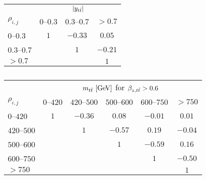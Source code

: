 \begin{table}[!htp]\centering
\begin{tabular}{l c c c }
  \toprule
  &\multicolumn{3}{c}{$|y_{t\bar{t}}{}|$}    \\
  $\rho_{i,j}$      &  $0$--$0.3$   &  $0.3$--$0.7$  &  $>0.7$  \\
  \midrule
  $0$--$0.3$    &   $1$   &   $-0.33$  &   $0.05$   \\
  $0.3$--$0.7$  &         &   $1$      &   $-0.21$  \\
  $>0.7$        &         &            &   $1$      \\
  \bottomrule
\end{tabular}
\caption{ }
\label{tab:corr_ytt}
\end{table}

\begin{table}[!htp]\centering
\begin{tabular}{l c c c c c }
  \toprule
  &\multicolumn{5}{c}{$m_{t\bar{t}}{}~[\rm{GeV}]$ for $\beta_{z,t\bar{t}}{}> 0.6$}    \\
  $\rho_{i,j}$ & $0$--$420$ & $420$--$500$ & $500$--$600$ & $600$--$750$ & $>750$ \\
  \midrule
  $0$--$420$      & $1$ & $-0.36$ & $0.08$  & $-0.01$ & $0.01$  \\
  $420$--$500$    &     & $1$     & $-0.57$ & $0.19$  & $-0.04$ \\
  $500$--$600$    &     &         & $1$     & $-0.59$ & $0.16$  \\
  $600$--$750$    &     &         &         & $1$     & $-0.50$ \\
  $>750$          &     &         &         &         & $1$     \\
  \bottomrule
\end{tabular}
\caption{ }
\label{tab:corr_mtt_beta}
\end{table}
